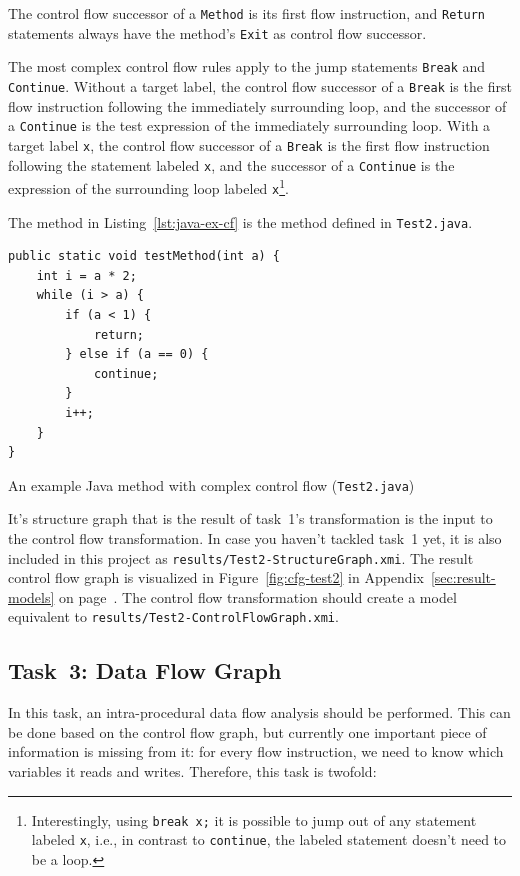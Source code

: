 \documentclass[11pt]{article}
\begin{document}
The control flow successor of a \verb|Method| is its first flow instruction,
and \verb|Return| statements always have the method's \verb|Exit| as control
flow successor.

The most complex control flow rules apply to the jump statements \verb|Break|
and \verb|Continue|.  Without a target label, the control flow successor of a
\verb|Break| is the first flow instruction following the immediately
surrounding loop, and the successor of a \verb|Continue| is the test expression
of the immediately surrounding loop.  With a target label \verb|x|, the control
flow successor of a \verb|Break| is the first flow instruction following the
statement labeled \verb|x|, and the successor of a \verb|Continue| is the
expression of the surrounding loop labeled \verb|x|\footnote{Interestingly,
  using \texttt{break x;} it is possible to jump out of any statement labeled
  \texttt{x}, i.e., in contrast to \texttt{continue}, the labeled statement
  doesn't need to be a loop.}.


The method in Listing~\ref{lst:java-ex-cf} is the method defined in
\verb|Test2.java|.

\begin{listing}
  \begin{verbatim}
public static void testMethod(int a) {
    int i = a * 2;
    while (i > a) {
        if (a < 1) {
            return;
        } else if (a == 0) {
            continue;
        }
        i++;
    }
}
  \end{verbatim}
  \caption{An example Java method with complex control flow
    (\texttt{Test2.java})}
  \label{lst:java-ex-cf}
\end{listing}

It's structure graph that is the result of task~1's transformation is the input
to the control flow transformation.  In case you haven't tackled task~1 yet, it
is also included in this project as \verb|results/Test2-StructureGraph.xmi|.
The result control flow graph is visualized in Figure~\ref{fig:cfg-test2} in
Appendix~\ref{sec:result-models} on page~\pageref{fig:cfg-test2}.  The control
flow transformation should create a model equivalent to
\verb|results/Test2-ControlFlowGraph.xmi|.


\subsection{Task~3: Data Flow Graph}
\label{sec:task3-df-graph}

In this task, an intra-procedural data flow analysis should be performed.  This
can be done based on the control flow graph, but currently one important piece
of information is missing from it: for every flow instruction, we need to know
which variables it reads and writes.  Therefore, this task is twofold:
\end{document}
